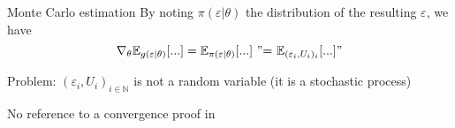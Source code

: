 \begin{frame}{Monte Carlo estimation}
  By noting $\pi(\varepsilon|\theta)$ the distribution of the resulting $\varepsilon$, we have
  $$ \nabla_\theta \mathbb{E}_{g(\varepsilon|\theta)}[...] = \mathbb{E}_{\pi(\varepsilon|\theta)}[...] ~ {"}{=} ~ \mathbb{E}_{(\varepsilon_i, U_i)_i}[...]" $$
  \medskip


  Problem: $(\varepsilon_i, U_i)_{i \in \mathbb{N}}$ is not a random variable
  (it is a stochastic process)

  No reference to a convergence proof in \cite{davidson_hyperspherical_2022,naesseth2020reparameterization,paisley2012variational,mnih2014neural}
\end{frame}